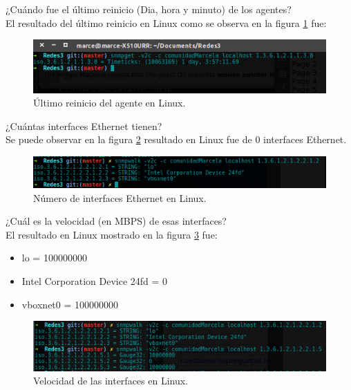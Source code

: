 \item ¿Cuándo fue el último reinicio (Dia, hora y minuto)  de los agentes?
\\ El resultado del último reinicio en Linux como se observa en la figura \ref{image:reinicio} fue:

\FloatBarrier
\begin{figure}[htbp!]
		\centering
			\includegraphics[width=.9 \textwidth]{images/Pregunta1}
		\caption{Último reinicio del agente en Linux.}
		\label{image:reinicio}
\end{figure}
\FloatBarrier

\item ¿Cuántas interfaces Ethernet tienen?
\\ Se puede observar en la figura \ref{image:interfaces} resultado en Linux fue de 0 interfaces Ethernet.
\FloatBarrier
\begin{figure}[htbp!]
		\centering
			\includegraphics[width=.9 \textwidth]{images/Pregunta2L}
		\caption{Número de interfaces Ethernet en Linux.}
		\label{image:interfaces}
\end{figure}
\FloatBarrier

\item ¿Cuál es la velocidad (en MBPS) de esas interfaces?
\\ El resultado en Linux mostrado en la figura \ref{image:velocidadInterfaces} fue:
\begin{itemize}
\item lo = 100000000
\item Intel Corporation Device 24fd = 0 
\item vboxnet0 = 100000000
\end{itemize}
\FloatBarrier
\begin{figure}[htbp!]
		\centering
			\includegraphics[width=.9 \textwidth]{images/Pregunta3L}
		\caption{Velocidad de las interfaces en Linux.}
		\label{image:velocidadInterfaces}
\end{figure}
\FloatBarrier